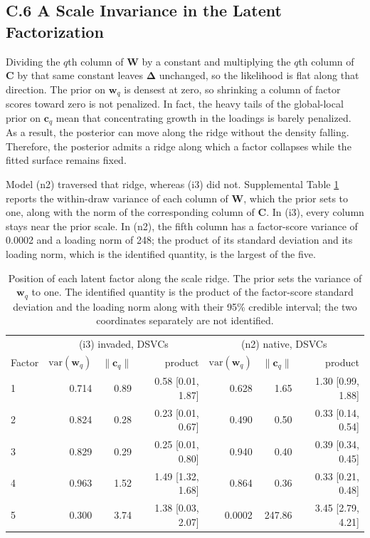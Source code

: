 \documentclass{article}
\begin{document}
\subsection*{C.6 A Scale Invariance in the Latent Factorization}
 
Dividing the $q$th column of $\mathbf{W}$ by a constant and multiplying the $q$th column of $\mathbf{C}$ by that same constant leaves $\boldsymbol\Delta$ unchanged, so the likelihood is flat along that direction. The prior on $\mathbf{w}_q$ is densest at zero, so shrinking a column of factor scores toward zero is not penalized. In fact, the heavy tails of the global-local prior on $\mathbf{c}_q$ mean that concentrating growth in the loadings is barely penalized. As a result, the posterior can move along the ridge without the density falling. Therefore, the posterior admits a ridge along which a factor collapses while the fitted surface remains fixed.
 
Model (n2) traversed that ridge, whereas (i3) did not. Supplemental Table \ref{tab:g5} reports the within-draw variance of each column of $\mathbf{W}$, which the prior sets to one, along with the norm of the corresponding column of $\mathbf{C}$. In (i3), every column stays near the prior scale. In (n2), the fifth column has a factor-score variance of 0.0002 and a loading norm of 248; the product of its standard deviation and its loading norm, which is the identified quantity, is the largest of the five.
 
\begin{table}[h]
\caption{Position of each latent factor along the scale ridge. The prior sets the variance of $\mathbf{w}_q$ to one. The identified quantity is the product of the factor-score standard deviation and the loading norm along with their 95\% credible interval; the two coordinates separately are not identified.}
\begin{tabular}{l|rrr|rrr}
\label{tab:g5}
 & \multicolumn{3}{c|}{(i3) invaded, DSVCs} & \multicolumn{3}{c}{(n2) native, DSVCs} \\
Factor & $\mathrm{var}(\mathbf{w}_q)$ & $\|\mathbf{c}_q\|$ & product & $\mathrm{var}(\mathbf{w}_q)$ & $\|\mathbf{c}_q\|$ & product \\ \hline
1 & 0.714 & 0.89 & 0.58 [0.01, 1.87] & 0.628  & 1.65   & 1.30 [0.99, 1.88] \\
2 & 0.824 & 0.28 & 0.23 [0.01, 0.67] & 0.490  & 0.50   & 0.33 [0.14, 0.54] \\
3 & 0.829 & 0.29 & 0.25 [0.01, 0.80] & 0.940  & 0.40   & 0.39 [0.34, 0.45] \\
4 & 0.963 & 1.52 & 1.49 [1.32, 1.68] & 0.864  & 0.36   & 0.33 [0.21, 0.48] \\
5 & 0.300 & 3.74 & 1.38 [0.03, 2.07] & 0.0002 & 247.86 & 3.45 [2.79, 4.21]
\end{tabular}
\end{table}
 
\end{document}
